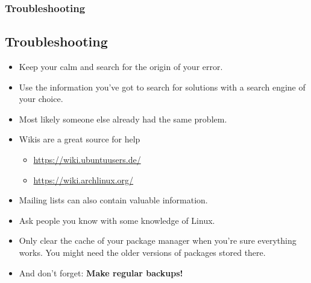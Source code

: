 \begin{frame}
	\frametitle{Troubleshooting}
	\subsection{Troubleshooting}
	
	\begin{itemize}
		\item Keep your calm and search for the origin of your error.
		\item Use the information you've got to search for solutions with a search engine of your choice.
		\item Most likely someone else already had the same problem.
		\item Wikis are a great source for help
			\begin{itemize}
				\item \url{https://wiki.ubuntuusers.de/}
				\item \url{https://wiki.archlinux.org/}
			\end{itemize}
		\item Mailing lists can also contain valuable information.
		\item Ask people you know with some knowledge of Linux.
		\item Only clear the cache of your package manager when you're sure everything works. You might need the older versions of packages stored there.
		\item And don't forget: \textbf{Make regular backups!}
	\end{itemize}
\end{frame}
